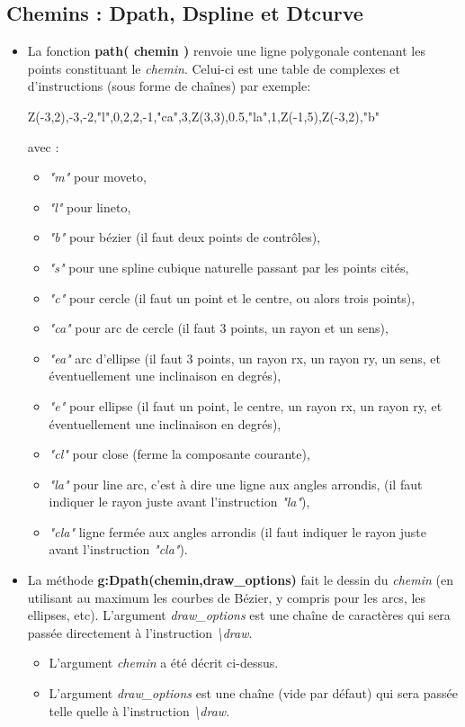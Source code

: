 \subsection{Chemins : Dpath, Dspline et Dtcurve}

\begin{itemize}
\item La fonction \textbf{path( chemin )} renvoie une ligne polygonale contenant les points constituant le \emph{chemin}. Celui-ci est une table de complexes et d'instructions (sous forme de chaînes) par exemple:

\begin{TeXcode}
  { Z(-3,2),-3,-2,"l",0,2,2,-1,"ca",3,Z(3,3),0.5,"la",1,Z(-1,5),Z(-3,2),"b" } 
\end{TeXcode}  
avec :
      \begin{itemize}
      \item \emph{"m"} pour moveto,
      \item \emph{"l"} pour lineto,
      \item \emph{"b"} pour bézier (il faut deux points de contrôles),
      \item \emph{"s"} pour une spline cubique naturelle passant par les points cités,
      \item \emph{"c"} pour cercle (il faut un point et le centre, ou alors trois points),
      \item \emph{"ca"} pour arc de cercle (il faut 3 points, un rayon et un sens),
      \item \emph{"ea"} arc d'ellipse (il faut 3 points, un rayon rx, un rayon ry, un sens, et éventuellement une inclinaison en degrés),
      \item \emph{"e"} pour ellipse (il faut un point, le centre, un rayon rx, un rayon ry, et éventuellement une inclinaison en degrés),
      \item \emph{"cl"} pour close (ferme la composante courante),
      \item \emph{"la"} pour line arc, c'est à dire une ligne aux angles arrondis, (il faut indiquer le rayon juste avant l'instruction \emph{"la"}),
      \item \emph{"cla"} ligne fermée aux angles arrondis (il faut indiquer le rayon juste avant l'instruction \emph{"cla"}).
      \end{itemize}
  
\item La méthode \textbf{g:Dpath(chemin,draw\_options)} fait le dessin du \emph{chemin} (en utilisant au maximum les courbes de Bézier, y compris pour les arcs, les ellipses, etc). L'argument \emph{draw\_options} est une chaîne de caractères qui sera passée directement à l'instruction \emph{\textbackslash draw}.
      \begin{itemize}
      \item L'argument \emph{chemin} a été décrit ci-dessus.
      \item L'argument \emph{draw\_options} est une chaîne (vide par défaut) qui sera passée telle quelle à l'instruction \emph{\textbackslash draw}.
      \end{itemize}
  

\end{itemize}
